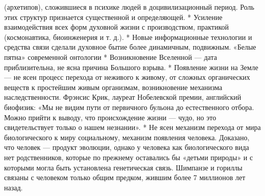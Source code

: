 \documentclass[12pt]{article}
\begin{document}
(архетипов),  сложившиеся  в  психике  людей  в  доцивилизационный  период.  Роль  этих  структур  признается
существенной и определяющей.
    *  Усиление  взаимодействия  всех  форм  духовной  жизни  с  производством,  практикой  (космонавтика,
биоинженерия и т. д.).
    *  Новые  информационные  технологии  и  средства  связи  сделали  духовное  бытие  более  динамичным,
подвижным.
«Белые пятна» современной онтологии
* Возникновение Вселенной — дата приблизительна, не ясна причина Большого взрыва.
* Появление жизни на Земле — не ясен процесс перехода от неживого к живому, от сложных органических
веществ к простейшим живым организмам, возникновение механизма наследственности.
Фрэнсис Крик, лауреат Нобелевской премии, английский биофизик: «Мы не видим пути от первичного бульона
до естественного отбора. Можно прийти к выводу, что происхождение жизни — чудо, но это свидетельствует
только о нашем незнании».
 * Не ясен механизм перехода от мира биологического к миру социальному, механизм появления человека.
Доказано, что человек — продукт эволюции, однако у человека как биологического вида нет родственников,
которые по прежнему оставались бы «детьми природы» и с которыми могла быть установлена генетическая
связь. Шимпанзе и гориллы связаны с человеком только общим предком, жившим более 7 миллионов лет назад.


\newpage
\end{document}
